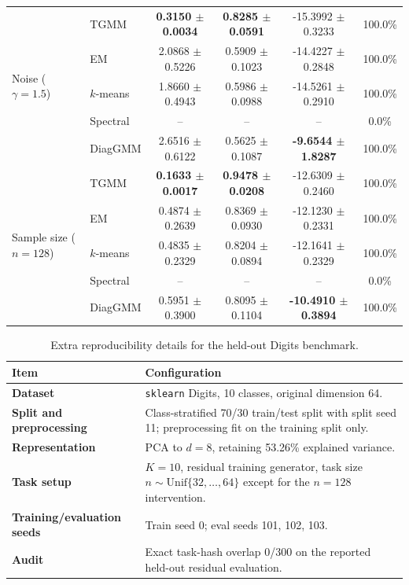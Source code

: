 \documentclass{article}
\begin{document}
\begin{table}[t]
\begin{threeparttable}
{\begin{tabular}{llcccc}
\midrule
\multirow{5}{*}{Noise ($\gamma=1.5$)}
& TGMM & \textbf{0.3150 $\pm$ 0.0034} & \textbf{0.8285 $\pm$ 0.0591} & -15.3992 $\pm$ 0.3233 & 100.0\% \\
& EM & 2.0868 $\pm$ 0.5226 & 0.5909 $\pm$ 0.1023 & -14.4227 $\pm$ 0.2848 & 100.0\% \\
& $k$-means & 1.8660 $\pm$ 0.4943 & 0.5986 $\pm$ 0.0988 & -14.5261 $\pm$ 0.2910 & 100.0\% \\
& Spectral & -- & -- & -- & 0.0\% \\
& DiagGMM & 2.6516 $\pm$ 0.6122 & 0.5625 $\pm$ 0.1087 & \textbf{-9.6544 $\pm$ 1.8287} & 100.0\% \\
\midrule
\multirow{5}{*}{Sample size ($n=128$)}
& TGMM & \textbf{0.1633 $\pm$ 0.0017} & \textbf{0.9478 $\pm$ 0.0208} & -12.6309 $\pm$ 0.2460 & 100.0\% \\
& EM & 0.4874 $\pm$ 0.2639 & 0.8369 $\pm$ 0.0930 & -12.1230 $\pm$ 0.2331 & 100.0\% \\
& $k$-means & 0.4835 $\pm$ 0.2329 & 0.8204 $\pm$ 0.0894 & -12.1641 $\pm$ 0.2329 & 100.0\% \\
& Spectral & -- & -- & -- & 0.0\% \\
& DiagGMM & 0.5951 $\pm$ 0.3900 & 0.8095 $\pm$ 0.1104 & \textbf{-10.4910 $\pm$ 0.3894} & 100.0\% \\
\bottomrule
\end{tabular}%
}
\end{threeparttable}
\end{table}

\begin{table}[t]
\centering
\small
\caption{Extra reproducibility details for the held-out Digits benchmark.}
\label{tab:digits-config}
\begin{tabularx}{\linewidth}{>{\bfseries}l X}
\toprule
Item & Configuration \\
\midrule
Dataset & \texttt{sklearn} Digits, 10 classes, original dimension 64. \\
Split and preprocessing & Class-stratified 70/30 train/test split with split seed 11; preprocessing fit on the training split only. \\
Representation & PCA to $d=8$, retaining 53.26\% explained variance. \\
Task setup & $K=10$, residual training generator, task size $n \sim \mathrm{Unif}\{32,\dots,64\}$ except for the $n=128$ intervention. \\
Training/evaluation seeds & Train seed 0; eval seeds 101, 102, 103. \\
Audit & Exact task-hash overlap 0/300 on the reported held-out residual evaluation. \\
\bottomrule
\end{tabularx}
\end{table}
\end{document}
